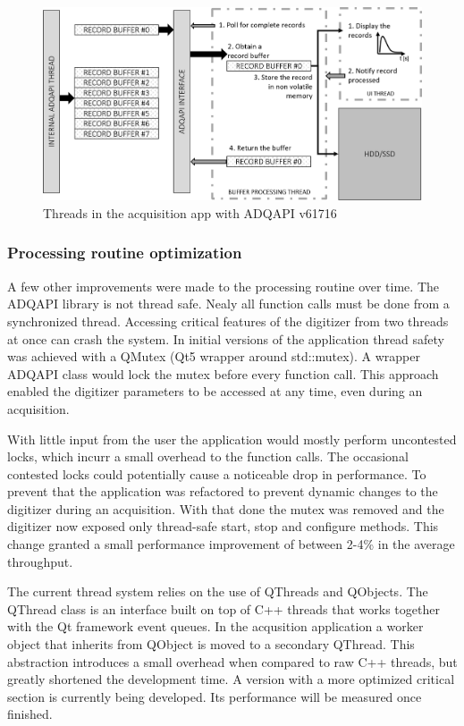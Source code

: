 \begin{figure}[H]
  \centering
  \includegraphics[width=\linewidth]{media/threads_in_new_app.png}
  \caption{Threads in the acquisition app with ADQAPI v61716}
  \label{fig:threads_in_new_app} 
\end{figure}


\subsubsection{Processing routine optimization}

A few other improvements were made to the processing routine over time.
The ADQAPI library is not thread safe. Nealy all function calls
must be done from a synchronized thread. Accessing critical features
of the digitizer from two threads at once can crash the system.
In initial versions of the application thread safety was achieved
with a QMutex (Qt5 wrapper around std::mutex). A wrapper ADQAPI class
would lock the mutex before every function call. This approach enabled
the digitizer parameters to be accessed at any time, even during an acquisition.


With little input from the user the application would mostly perform
uncontested locks, which incurr a small overhead to the function calls.
The occasional contested locks could potentially cause a noticeable drop in performance.
To prevent that the application was refactored to prevent dynamic changes
to the digitizer during an acquisition. With that done the mutex was removed
and the digitizer now exposed only thread-safe start, stop and configure methods.
This change granted a small performance improvement of between 2-4\% in the average throughput.


The current thread system relies on the use of QThreads and QObjects.
The QThread class is an interface built on top of C++ threads that 
works together with the Qt framework event queues.
In the acqusition application a worker object
that inherits from QObject is moved to a secondary QThread.
This abstraction introduces a small overhead when compared
to raw C++ threads, but greatly shortened the development time.
A version with a more optimized critical section is currently being developed.
Its performance will be measured once finished.

